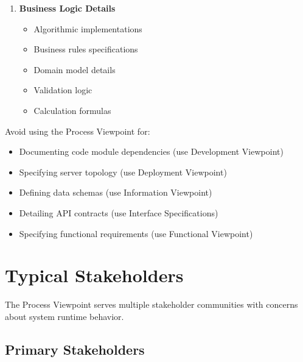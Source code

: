 \documentclass[11pt,letterpaper]{article}
\begin{document}
\begin{enumerate}[label=\textbf{AC\arabic*:}, leftmargin=2.5em]
    \item \textbf{Business Logic Details}
    \begin{itemize}[nosep]
        \item Algorithmic implementations
        \item Business rules specifications
        \item Domain model details
        \item Validation logic
        \item Calculation formulas
    \end{itemize}
\end{enumerate}

\begin{warningbox}
Avoid using the Process Viewpoint for:

\begin{itemize}[nosep]
    \item Documenting code module dependencies (use Development Viewpoint)
    \item Specifying server topology (use Deployment Viewpoint)
    \item Defining data schemas (use Information Viewpoint)
    \item Detailing API contracts (use Interface Specifications)
    \item Specifying functional requirements (use Functional Viewpoint)
\end{itemize}
\end{warningbox}

\section{Typical Stakeholders}

The Process Viewpoint serves multiple stakeholder communities with concerns about system runtime behavior.

\subsection{Primary Stakeholders}
\end{document}
